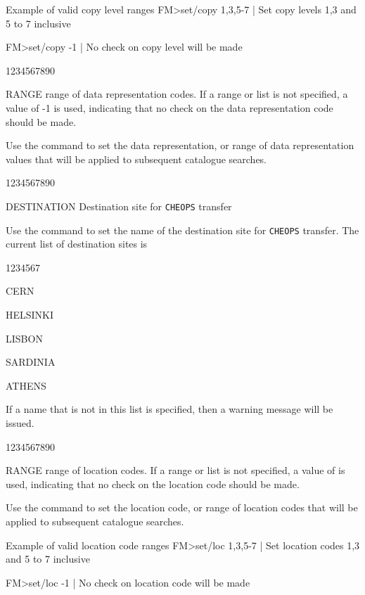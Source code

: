 \begin{XMPt}{Example of valid copy level ranges}
FM>set/copy 1,3,5-7 | Set copy levels 1,3 and 5 to 7 inclusive

FM>set/copy -1      | No check on copy level will be made
\end{XMPt}

\begin{DLtt}{1234567890}
\item[RANGE]range of data representation codes. 
If a range or list is not specified,
a value of -1 is used, indicating that no check on the data representation
code should be made.
\end{DLtt}
Use the  command to set the data representation, 
or range of data representation values
that will be applied to subsequent catalogue searches.

\begin{DLtt}{1234567890}
\item[DESTINATION]Destination site for {\tt CHEOPS} transfer
\end{DLtt}
Use the  command to set the name of the
destination site for {\tt CHEOPS} transfer. The current list
of destination sites is

\begin{DLtt}{1234567}
\item[CERN]
\item[HELSINKI]
\item[LISBON]
\item[SARDINIA]
\item[ATHENS]
\end{DLtt}

If a name that is not in this list is specified, then
a warning message will be issued.



\begin{DLtt}{1234567890}
\item[RANGE]range of location codes. If a range or list is not specified,
a value of  is used, indicating that no check on the location code
should be made.
\end{DLtt}

Use the  command to set the location code, or range of 
location codes
that will be applied to subsequent catalogue searches.

\begin{XMPt}{Example of valid location code ranges}
FM>set/loc 1,3,5-7 | Set location codes 1,3 and 5 to 7 inclusive

FM>set/loc -1      | No check on location code will be made
\end{XMPt}

